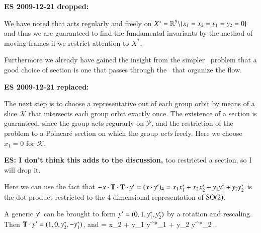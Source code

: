 {\bf ES 2009-12-21 dropped:}

We have noted that  acts regularly and freely on
$X^*=\mathbb{R}^{5}\backslash\{x_1=x_2=y_1=y_2=0\}$ and thus we are
guaranteed to find the fundamental invariants by the method
of moving frames if we restrict attention to $X^*$.

Furthermore we already have gained the insight from
the simpler \Le\ problem that a good choice of section is one
that passes through the \eqva\ that organize the flow. 

{\bf ES 2009-12-21 replaced:}

The next step is to choose a representative out of each group
orbit by means of a slice $\mathcal{K}$ that
intersects each group orbit exactly once. The existence of a
section is guaranteed, since the group acts regurarly on $\mathcal{P}$, and the
restriction of the problem to a Poincar\'e section on which the
group \emph{acts} freely. Here we choose $x_1=0$ for
$\mathcal{K}$.

{\bf ES: I don't think this adds to the discussion,} too restricted a section,
so I will drop it.

Here we can use the fact that
$- x \cdot \mathbf{T}\cdot\mathbf{T} \cdot {\ensuremath{y'}}
 = (x \cdot {\ensuremath{y'}} )_4 =
    x_1 x_1^{*}
   +x_2 x_2^{*}
   +y_1 y_1^{*}
   +y_2 y_2^{*}
$
is the dot-product restricted to the 4-dimensional
representation of $\textrm{SO}(2)$.

A generic  $ {y'} $ can be brought to form $ {y'}  =
(0,1,y_1^{*},y_2^{*})$ by a rotation and rescaling. Then $\mathbf{T}
\cdot {\ensuremath{y'}}   = (1,0,y_2^{*},-y_1^{*})$, and
\beq
{} =
     {x_2 + y_1 y^{*}_1 + y_2 y^{*}_2}
\,.
\label{PCsectSin}
\eeq
